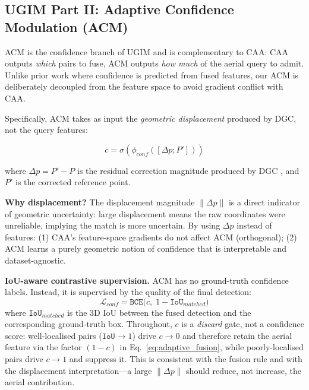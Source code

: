 \documentclass[9.5pt,twocolumn,a4paper]{IEEEtran}
\def\msc#1{\texttt{#1}}
\begin{document}
\subsection{UGIM Part II: Adaptive Confidence Modulation (ACM)}
\label{sec:acm}

ACM is the confidence branch of UGIM and is complementary to CAA: CAA outputs \emph{which} pairs to fuse, ACM outputs \emph{how much} of the aerial query to admit. Unlike prior work where confidence is predicted from fused features, our ACM is deliberately decoupled from the feature space to avoid gradient conflict with CAA.

Specifically, ACM takes as input the \emph{geometric displacement} produced by DGC, not the query features:

\begin{equation}
    c = \sigma\left( \phi_{conf}\left( [\Delta p; P'] \right) \right)
    \label{eq:confidence_decoupled}
\end{equation}

where $\Delta p = P' - P$ is the residual correction magnitude produced by DGC , and $P'$ is the corrected reference point.

\textbf{Why displacement?} The displacement magnitude $\|\Delta p\|$ is a direct indicator of geometric uncertainty: large displacement means the raw coordinates were unreliable, implying the match is more uncertain. By using $\Delta p$ instead of features: (1) CAA's feature-space gradients do not affect ACM (orthogonal); (2) ACM learns a purely geometric notion of confidence that is interpretable and dataset-agnostic.

\textbf{IoU-aware contrastive supervision.} ACM has no ground-truth confidence labels. Instead, it is supervised by the quality of the final detection:
\begin{equation}
    \mathcal{L}_{conf} = \msc{BCE}\big(c,\; 1 - \msc{IoU}_{matched}\big)
    \label{eq:iou_loss}
\end{equation}
where $\msc{IoU}_{matched}$ is the 3D IoU between the fused detection and the corresponding ground-truth box. Throughout, $c$ is a \emph{discard} gate, not a confidence score: well-localised pairs ($\msc{IoU}\!\to\!1$) drive $c \rightarrow 0$ and therefore retain the aerial feature via the factor $(1-c)$ in Eq.~\ref{eq:adaptive_fusion}, while poorly-localised pairs drive $c \rightarrow 1$ and suppress it. This is consistent with the fusion rule and with the displacement interpretation---a large $\|\Delta p\|$ should reduce, not increase, the aerial contribution.
\end{document}

